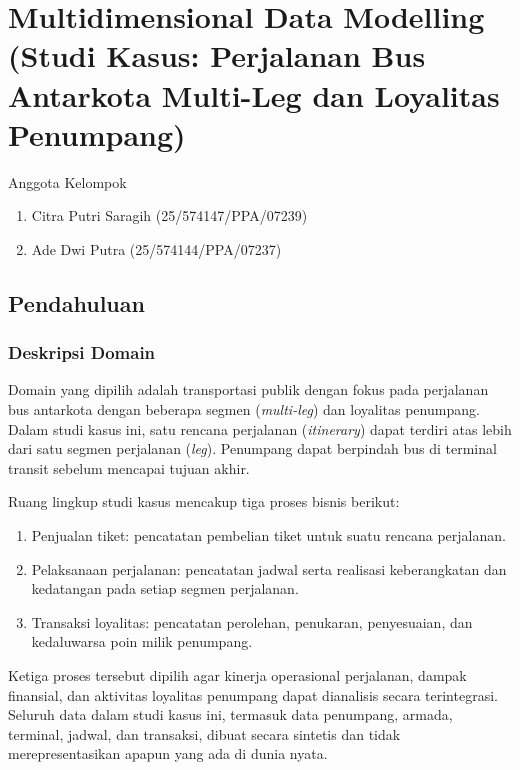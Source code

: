 \chapter{Multidimensional Data Modelling (Studi Kasus: Perjalanan Bus Antarkota Multi-Leg dan Loyalitas Penumpang)}
\begin{mybox}{Anggota Kelompok}
\begin{enumerate}
    \itemsep0em
    \item Citra Putri Saragih (25/574147/PPA/07239)
    \item Ade Dwi Putra (25/574144/PPA/07237)
\end{enumerate}
\end{mybox}

\section{Pendahuluan}
\subsection{Deskripsi Domain}

Domain yang dipilih adalah transportasi publik dengan fokus pada perjalanan bus
antarkota dengan beberapa segmen (\textit{multi-leg}) dan loyalitas penumpang.
Dalam studi kasus ini, satu rencana perjalanan (\textit{itinerary}) dapat terdiri
atas lebih dari satu segmen perjalanan (\textit{leg}). Penumpang dapat berpindah
bus di terminal transit sebelum mencapai tujuan akhir.

Ruang lingkup studi kasus mencakup tiga proses bisnis berikut:
\begin{enumerate}[label=\alph*., leftmargin=*, topsep=0pt, itemsep=0pt,
    parsep=0pt, partopsep=0pt, before=\vspace{-\parskip}]
    \item Penjualan tiket: pencatatan pembelian tiket untuk suatu
    rencana perjalanan.
    \item Pelaksanaan perjalanan: pencatatan jadwal serta realisasi
    keberangkatan dan kedatangan pada setiap segmen perjalanan.
    \item Transaksi loyalitas: pencatatan perolehan, penukaran,
    penyesuaian, dan kedaluwarsa poin milik penumpang.
\end{enumerate}

Ketiga proses tersebut dipilih agar kinerja operasional perjalanan, dampak finansial,
dan aktivitas loyalitas penumpang dapat dianalisis secara terintegrasi. Seluruh data
dalam studi kasus ini, termasuk data penumpang, armada, terminal, jadwal, dan
transaksi, dibuat secara sintetis dan tidak merepresentasikan apapun yang ada di dunia nyata.


